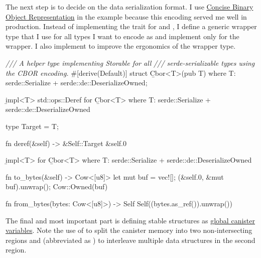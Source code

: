 \documentclass{article}
\begin{document}
The next step is to decide on the data serialization format.
I use \href{https://cbor.io/}{Concise Binary Object Representation} in the example because this encoding served me well in production.
Instead of implementing the \href{#storable-trait}{} trait for  and , I define a generic wrapper type  that I use for all types I want to encode as  and implement \href{#storable-trait}{} only for the wrapper.
I also implement \href{https://doc.rust-lang.org/std/ops/trait.Deref.html}{} to improve the ergonomics of the wrapper type.

\begin{code}[rust]
\emph{/// A helper type implementing Storable for all}
\emph{/// serde-serializable types using the CBOR encoding.}
#[derive(Default)]
struct \b{Cbor}<T>(pub T)
where T: serde::Serialize + serde::de::DeserializeOwned;

\b{impl}<T> std::ops::Deref for \b{Cbor}<T>
where T: serde::Serialize + serde::de::DeserializeOwned
{
  type Target = T;

  fn deref(&self) -> &Self::Target { &self.0 }
}

\b{impl}<T> \href{#storable-trait}{} for \b{Cbor}<T>
where T: serde::Serialize + serde::de::DeserializeOwned
{
  fn to_bytes(&self) -> Cow<[u8]> {
    let mut buf = vec![];
    \href{https://docs.rs/ciborium/0.2.0/ciborium/ser/fn.into_writer.html}{}(&self.0, &mut buf).unwrap();
    Cow::Owned(buf)
  }

  fn from_bytes(bytes: Cow<[u8]>) -> Self {
    Self(\href{https://docs.rs/ciborium/0.2.0/ciborium/de/fn.from_reader.html}{}(bytes.as_ref()).unwrap())
  }
}
\end{code}

The final and most important part is defining stable structures as \href{/posts/01-effective-rust-canisters.html#use-threadlocal}{global canister variables}.
Note the use of \href{#restricted-memory}{} to split the canister memory into two non-intersecting regions and \href{#memory-manager}{} (abbreviated as ) to interleave multiple data structures in the second region.
\end{document}
